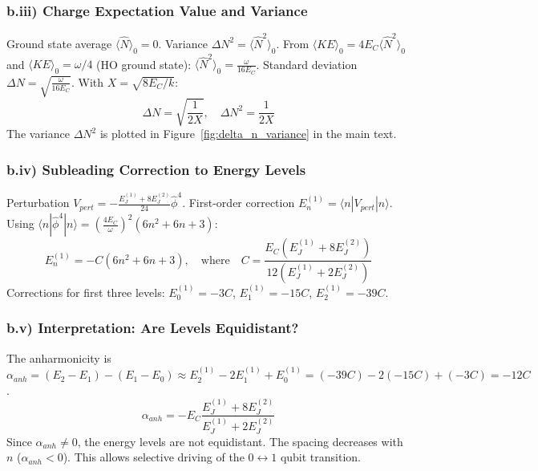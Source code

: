 \documentclass[12pt]{article}
\begin{document}
\begin{appendices}
\subsubsection*{b.iii) Charge Expectation Value and Variance}
\label{app:part_b:subsubsec_iii}
Ground state average $\langle \hat{N} \rangle_0 = 0$. Variance $\Delta N^2 = \langle \hat{N}^2 \rangle_0$. From $\langle KE \rangle_0 = 4 E_C \langle \hat{N}^2 \rangle_0$ and $\langle KE \rangle_0 = \omega/4$ (HO ground state): $\langle \hat{N}^2 \rangle_0 = \frac{\omega}{16 E_C}$. Standard deviation $\Delta N = \sqrt{\frac{\omega}{16 E_C}}$. With $X = \sqrt{8 E_C / k}$:
\begin{equation}
\Delta N = \sqrt{\frac{1}{2X}}, \quad \Delta N^2 = \frac{1}{2X}
\end{equation}
The variance $\Delta N^2$ is plotted in Figure~\ref{fig:delta_n_variance} in the main text. 

\subsubsection*{b.iv) Subleading Correction to Energy Levels}
\label{app:part_b:subsubsec_iv}
Perturbation $V_{pert} = -\frac{E_J^{(1)} + 8 E_J^{(2)}}{24} \hat{\phi}^4$. First-order correction $E_n^{(1)} = \langle n | V_{pert} | n \rangle$. Using $\langle n | \hat{\phi}^4 | n \rangle = (\frac{4E_C}{\omega})^2 (6n^2 + 6n + 3)$:
\begin{equation}
E_n^{(1)} = - C (6n^2 + 6n + 3), \quad \text{where} \quad C = \frac{E_C (E_J^{(1)} + 8 E_J^{(2)})}{12 (E_J^{(1)} + 2 E_J^{(2)})}
\label{eq:app_energy_corr_app} 
\end{equation}
Corrections for first three levels: $E_0^{(1)} = -3C$, $E_1^{(1)} = -15C$, $E_2^{(1)} = -39C$.

\subsubsection*{b.v) Interpretation: Are Levels Equidistant?}
\label{app:part_b:subsubsec_v}
The anharmonicity is $\alpha_{anh} = (E_2 - E_1) - (E_1 - E_0) \approx E_2^{(1)} - 2E_1^{(1)} + E_0^{(1)} = (-39C) - 2(-15C) + (-3C) = -12C$.
\begin{equation}
\alpha_{anh} = - E_C \frac{E_J^{(1)} + 8 E_J^{(2)}}{E_J^{(1)} + 2 E_J^{(2)}}
\end{equation}
Since $\alpha_{anh} \neq 0$, the energy levels are not equidistant. The spacing decreases with $n$ ($\alpha_{anh} < 0$). This allows selective driving of the $0 \leftrightarrow 1$ qubit transition.


\end{appendices}
\end{document}
